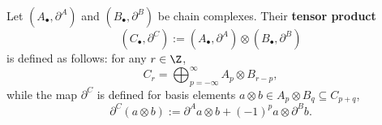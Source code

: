 \begin{definition}
  \label{cmc/chain_complex/tensor_product-definition}
  Let $(A_\bullet, \partial^A)$ and $(B_\bullet, \partial^B)$
  be chain complexes.
  Their \textbf{tensor product}
  \begin{equation}
    (C_\bullet, \partial^C)
    := (A_\bullet, \partial^A) \otimes (B_\bullet, \partial^B)
  \end{equation}
  is defined as follows: for any $r \in \Z$,
  \begin{equation}
    C_r = \bigoplus_{p = -\infty}^\infty A_p \otimes B_{r - p},
  \end{equation}
  while the map $\partial^C$ is defined for basis elements
  $a \otimes b \in A_p \otimes B_q \subseteq C_{p + q}$,
  \begin{equation}
    \partial^C(a \otimes b)
    := \partial^A a \otimes b + (-1)^p a \otimes \partial^B b.
  \end{equation}
\end{definition}
